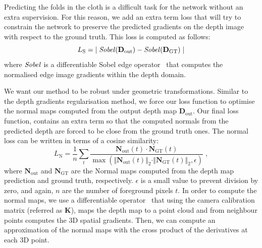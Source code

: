 \vspace{1mm}
 Predicting the folds in the cloth is a difficult task for the network without an extra supervision. For this reason, we add an extra term loss that will try to constrain the network to preserve the predicted gradients on the depth image with respect to the ground truth. This loss is computed as follows:
\begin{equation}
    L_\textrm{S} = {\mid \text{\textit{Sobel}}(\mathbf{D}_{\textrm{out}}) - \text{\textit{Sobel}}(\mathbf{D}_{\textrm{GT}}) \mid}
\end{equation}
where $\text{\textit{Sobel}}$ is a differentiable Sobel edge operator~\cite{eriba2020kornia} that computes the normalised edge image gradients within the depth domain.

\vspace{1mm}
 We want our method to be robust under geometric transformations. Similar to the depth gradients regularisation method, we force our loss function to optimise the normal maps computed from the output depth map $\mathbf{D}_{\textrm{out}}$. Our final loss function, contains an extra term so that the computed normals from the predicted depth are forced to be close from the ground truth ones. The normal loss can be written in terms of a cosine similarity:
\begin{equation}
        L_\textrm{N} = \frac{1}{n} \sum_{t} \dfrac{\mathbf{N}_{\textrm{out}}(t) \cdot \mathbf{N}_{\textrm{GT}}(t)}{\max(\Vert \mathbf{N}_{\textrm{out}}(t) \Vert _2 \cdot \Vert \mathbf{N}_{\textrm{GT}}(t) \Vert _2, \epsilon)}\;,
\end{equation}
where $\mathbf{N}_{\textrm{out}}$ and $\mathbf{N}_{\textrm{GT}}$ are the Normal maps computed from the depth map prediction and ground truth, respectively. $\epsilon$ is a small value to prevent division by zero, and again, $n$ are the number of foreground pixels $t$. In order to compute the normal maps, we  use a differentiable operator~\cite{eriba2019kornia, eriba2020kornia} that using the camera calibration matrix (referred as $\textbf{K}$), maps the depth map to a point cloud and from neighbour points computes the 3D spatial gradients. Then, we can compute an approximation of the normal maps with the cross product of the derivatives at each 3D point.


